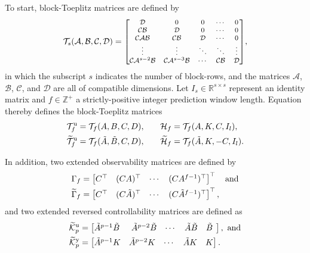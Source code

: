 To start, block-Toeplitz matrices are defined by
\begin{align}\label{eqn:blockToeplitz} 
\mathcal{T}_s(\mathcal{A},\mathcal{B},\mathcal{C},\mathcal{D}) =\scriptsize{
	\begin{bmatrix}
		\mathcal{D}         & 0         & 0      & \cdots  & 0\\
		\mathcal{C}\mathcal{B}        & \mathcal{D}         & 0      & \cdots  & 0\\
		\mathcal{C}\mathcal{A}\mathcal{B}       & \mathcal{C}\mathcal{B}        & \mathcal{D}      & \cdots & 0\\
		\vdots    &  \vdots & \ddots & \ddots & \vdots\\
		\mathcal{C}\mathcal{A}^{s-2}\mathcal{B} & \mathcal{C}\mathcal{A}^{s-3}\mathcal{B} & \cdots  & \mathcal{C}\mathcal{B}     & \mathcal{D}
	\end{bmatrix}},
\end{align}
in which the subscript $s$ indicates the number of block-rows, and the matrices $\mathcal{A}$, $\mathcal{B}$, $\mathcal{C}$, and $\mathcal{D}$ are all of compatible dimensions. Let $I_s\in\mathbb{R}^{s\times s}$ represent an identity matrix and $f\in\mathbb{Z}^+$ a strictly-positive integer prediction window length. Equation~ thereby defines the block-Toeplitz matrices
\begin{alignat*}{2}
\mathcal{T}_f^\mathrm{{u}}&=\mathcal{T}_f(A,B,C,D),\quad  &\mathcal{H}_f&=\mathcal{T}_f(A,K,C,I_l),\\
\widetilde{\mathcal{T}}_f^\mathrm{{u}}&=\mathcal{T}_f(\tilde{A},\tilde{B},C,D),\quad  &\widetilde{\mathcal{H}}_f&=\mathcal{T}_f(\tilde{A},K,-C,I_l).
\end{alignat*}

In addition, two extended observability matrices are defined by
\begin{align*}
\Gamma_f &= \begin{bmatrix}C^\top & (CA)^\top & \cdots & (CA^{f-1})^\top\end{bmatrix}^\top\quad\text{and}\\
\widetilde{\Gamma}_f &= \begin{bmatrix}C^\top & (C\tilde{A})^\top & \cdots & (C\tilde{A}^{f-1})^\top\end{bmatrix}^\top,
\end{align*}
and two extended reversed controllability matrices are defined as 
\begin{align*}
\widetilde{\mathcal{K}}_{p}^{\mathrm{{u}}} &= \begin{bmatrix} \tilde{A}^{p-1}\tilde{B}\:\, & \tilde{A}^{p-2}\tilde{B} & \cdots & \tilde{A}\tilde{B} & \tilde{B}\:\, \end{bmatrix},\text{ and}\\
\widetilde{\mathcal{K}}_{p}^{\mathrm{{y}}} &= \begin{bmatrix} \tilde{A}^{p-1}K & \tilde{A}^{p-2}K & \cdots & \tilde{A}K & K \end{bmatrix}.
\end{align*}

